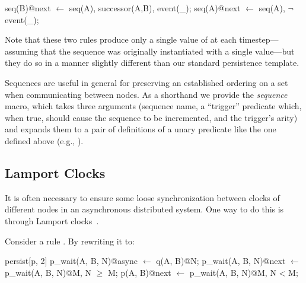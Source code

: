 \begin{Dedalus}
seq(B)@next \(\leftarrow\) seq(A), successor(A,B), event(_);  
seq(A)@next \(\leftarrow\) seq(A), \(\lnot\)event(_);
\end{Dedalus}

\noindent Note that these two rules produce only a single value of
 at each timestep---assuming that the sequence was originally
instantiated with a single value---but they do so in a manner slightly
different than our standard persistence template.

Sequences are useful in general for preserving an established ordering on a set
when communicating between nodes.  As a shorthand we provide the {\em sequence}
macro, which takes three arguments (sequence name, a ``trigger'' predicate
which, when true, should cause the sequence to be incremented, and the
trigger's arity) and expands them to a pair of definitions of a unary predicate
like the one defined above (e.g., ).

\subsection{Lamport Clocks}
\label{sec:lamport}
It is often necessary to ensure some loose synchronization between clocks of
different nodes in an asynchronous distributed system.  One way to do this is
through Lamport clocks~\cite{timeclocks}.

Consider a rule .  By rewriting it
to:

\begin{Dedalus}
persist[p, 2]
p\_wait(A, B, N)@async \(\leftarrow\) q(A, B)@N;
p\_wait(A, B, N)@next \(\leftarrow\) p\_wait(A, B, N)@M, N \(\ge\) M;
p(A, B)@next \(\leftarrow\) p\_wait(A, B, N)@M, N < M;
\end{Dedalus}

